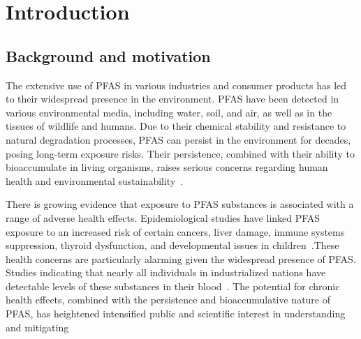 \chapter{Introduction}
\label{Chapter1}

\newcommand{\keyword}[1]{\textbf{#1}}
\newcommand{\tabhead}[1]{\textbf{#1}}
\newcommand{\code}[1]{\texttt{#1}}
\newcommand{\file}[1]{\texttt{\bfseries#1}}
\newcommand{\option}[1]{\texttt{\itshape#1}}

\vspace{-1cm}
\section{Background and motivation} \label{sec:background_motivation}


The extensive use of PFAS in various industries and consumer products has led to their widespread presence in the environment. PFAS have been detected in various environmental media, including water, soil, and air, as well as in the tissues of wildlife and humans. Due to their chemical stability and resistance to natural degradation processes, PFAS can persist in the environment for decades, posing long-term exposure risks. Their persistence, combined with their ability to bioaccumulate in living organisms, raises serious concerns regarding human health and environmental sustainability~\cite{PFAS_in_animals_humans, PFAS_livestock, PFAS_environ_impacts_health, PFAS_in_water, PFAS_in_drinking_water}.

There is growing evidence that exposure to PFAS substances is associated with a range of adverse health effects. Epidemiological studies have linked PFAS exposure to an increased risk of certain cancers, liver damage, immune systems suppression, thyroid dysfunction, and developmental issues in children~\cite{PFAS_cancers_1, PFAS_cancers_2, PFAS_fatty_liver_USA, PFAS_immune_suppression, PFAS_developmental_issues}.These health concerns are particularly alarming given the widespread presence of PFAS. Studies indicating that nearly all individuals in industrialized nations have detectable levels of these substances in their blood~\cite{PFAS_Italy}. The potential for chronic health effects, combined with the persistence and bioaccumulative nature of PFAS, has heightened intensified public and scientific interest in understanding and mitigating

